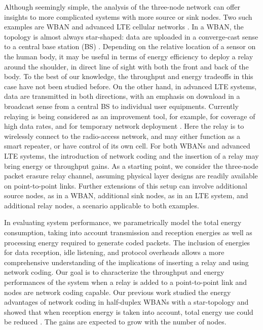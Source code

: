 \documentclass[journal, letterpaper]{IEEEtran}
\begin{document}
Although seemingly simple, the analysis of the three-node network can offer insights to more complicated systems with more source or sink nodes. Two such examples are WBAN and advanced LTE cellular networks \cite{3gpp}. In a WBAN, the topology is almost always star-shaped: data are uploaded in a converge-cast sense to a central base station (BS) \cite{latre2011survey,kwak2009study}. Depending on the relative location of a sensor on the human body, it may be useful in terms of energy efficiency to deploy a relay around the shoulder, in direct line of sight with both the front and back of the body. To the best of our knowledge, the throughput and energy tradeoffs in this case have not been studied before. On the other hand, in advanced LTE systems, data are transmitted in both directions, with an emphasis on download in a broadcast sense from a central BS to individual user equipments. Currently relaying is being considered as an improvement tool, for example, for coverage of high data rates, and for temporary network deployment \cite{3gpp}. Here the relay is to wirelessly connect to the radio-access network, and may either function as a smart repeater, or have control of its own cell. For both WBANs and advanced LTE systems, the introduction of network coding and the insertion of a relay may bring energy or throughput gains. As a starting point, we consider the three-node packet erasure relay channel, assuming physical layer designs are readily available on point-to-point links. Further extensions of this setup can involve additional source nodes, as in a WBAN, additional sink nodes, as in an LTE system, and additional relay nodes, a scenario applicable to both examples.

In evaluating system performance, we parametrically model the total energy consumption, taking into account transmission and reception energies as well as processing energy required to generate coded packets. The inclusion of energies for data reception, idle listening, and protocol overheads allows a more comprehensive understanding of the implications of inserting a relay and using network coding. Our goal is to characterize the throughput and energy performances of the system when a relay is added to a point-to-point link and nodes are network coding capable. Our previous work studied the energy advantages of network coding in half-duplex WBANs with a star-topology and showed that when reception energy is taken into account, total energy use could be reduced \cite{shi2011both}. The gains are expected to grow with the number of nodes.
\end{document}
